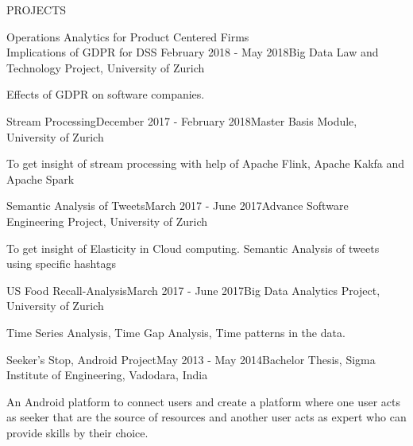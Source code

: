 \documentclass{resume} %
\begin{document}
\pagebreak
\begin{rSection}{PROJECTS}
\begin{rSubsection}{Operations Analytics for Product Centered Firms \\Implications of GDPR for DSS
}{February 2018 - May 2018}{Big Data Law and Technology Project, University of Zurich}{} 
\item Effects of GDPR on software companies.
\end{rSubsection} 
\begin{rSubsection}{Stream Processing}{December 2017 - February 2018}{Master Basis Module, University of Zurich}{} 
\item To get insight of stream processing with help of Apache Flink, Apache Kakfa and Apache Spark
\end{rSubsection} 
\begin{rSubsection}{Semantic Analysis of Tweets}{March 2017 - June 2017}{Advance Software Engineering Project, University of Zurich}{} 
\item To get insight of Elasticity in Cloud computing. Semantic Analysis of tweets using specific hashtags 
\end{rSubsection} 
\begin{rSubsection}{US Food Recall-Analysis}{March 2017 - June 2017}{Big Data Analytics Project, University of Zurich}{} 
\item Time Series Analysis, Time Gap Analysis, Time patterns in the data.
\end{rSubsection} 
\begin{rSubsection}{Seeker’s Stop, Android Project}{May 2013 - May 2014}{Bachelor Thesis, Sigma Institute of Engineering, Vadodara, India}{} 
\item An Android platform to connect users and create a platform where one user acts as seeker that are the source of resources and another user acts as expert who can provide skills by their choice.
\end{rSubsection} 
\end{rSection} 
\end{document}
